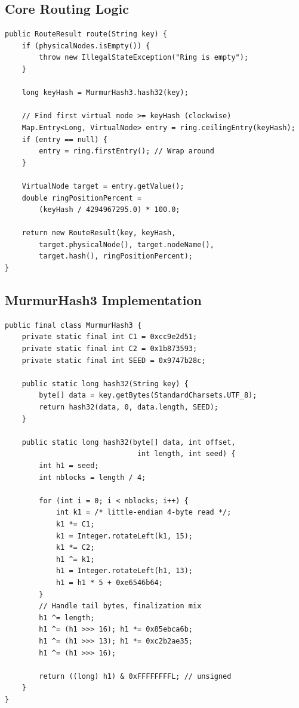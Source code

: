 \documentclass[12pt,a4paper]{report}
\begin{document}
\subsection{Core Routing Logic}
\begin{lstlisting}[style=JavaStyle, caption={ConsistentHashRouter.java -- Key Routing on the Ring}]
public RouteResult route(String key) {
    if (physicalNodes.isEmpty()) {
        throw new IllegalStateException("Ring is empty");
    }

    long keyHash = MurmurHash3.hash32(key);

    // Find first virtual node >= keyHash (clockwise)
    Map.Entry<Long, VirtualNode> entry = ring.ceilingEntry(keyHash);
    if (entry == null) {
        entry = ring.firstEntry(); // Wrap around
    }

    VirtualNode target = entry.getValue();
    double ringPositionPercent =
        (keyHash / 4294967295.0) * 100.0;

    return new RouteResult(key, keyHash,
        target.physicalNode(), target.nodeName(),
        target.hash(), ringPositionPercent);
}
\end{lstlisting}

\subsection{MurmurHash3 Implementation}
\begin{lstlisting}[style=JavaStyle, caption={MurmurHash3.java -- 32-bit Hash Function}]
public final class MurmurHash3 {
    private static final int C1 = 0xcc9e2d51;
    private static final int C2 = 0x1b873593;
    private static final int SEED = 0x9747b28c;

    public static long hash32(String key) {
        byte[] data = key.getBytes(StandardCharsets.UTF_8);
        return hash32(data, 0, data.length, SEED);
    }

    public static long hash32(byte[] data, int offset,
                               int length, int seed) {
        int h1 = seed;
        int nblocks = length / 4;

        for (int i = 0; i < nblocks; i++) {
            int k1 = /* little-endian 4-byte read */;
            k1 *= C1;
            k1 = Integer.rotateLeft(k1, 15);
            k1 *= C2;
            h1 ^= k1;
            h1 = Integer.rotateLeft(h1, 13);
            h1 = h1 * 5 + 0xe6546b64;
        }
        // Handle tail bytes, finalization mix
        h1 ^= length;
        h1 ^= (h1 >>> 16); h1 *= 0x85ebca6b;
        h1 ^= (h1 >>> 13); h1 *= 0xc2b2ae35;
        h1 ^= (h1 >>> 16);

        return ((long) h1) & 0xFFFFFFFFL; // unsigned
    }
}
\end{lstlisting}
\end{document}

